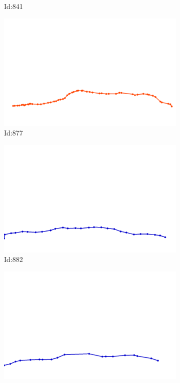 \documentclass[12pt,twoside]{report}
\begin{document}
\begin{figure}
\begin{subfigure}[b]{0.20\textwidth}
\caption{Id:841}
\end{subfigure}
\begin{subfigure}[b]{0.20\textwidth}
\centering
\includegraphics[width=\textwidth]{../trajectories/877.png}
\caption{Id:877}
\end{subfigure}
\begin{subfigure}[b]{0.20\textwidth}
\centering
\includegraphics[width=\textwidth]{../trajectories/882.png}
\caption{Id:882}
\end{subfigure}
\begin{subfigure}[b]{0.20\textwidth}
\centering
\includegraphics[width=\textwidth]{../trajectories/889.png}

\end{subfigure}
\end{figure}
\end{document}
